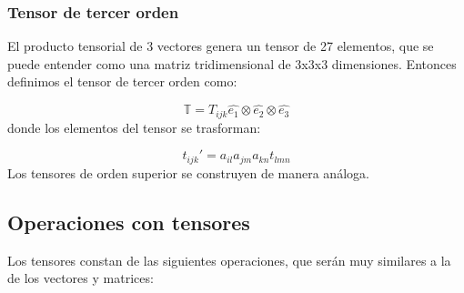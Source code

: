 \documentclass[12pt,a4paper]{book}
\begin{document}
\subsubsection{Tensor de tercer orden}

El producto tensorial de 3 vectores genera un tensor de 27 elementos, que se puede entender como una matriz tridimensional de 3x3x3 dimensiones. Entonces definimos el tensor de tercer orden como:

\begin{equation}
\mathbb{T} = T_{ijk} \widehat{e_1} \otimes \widehat{e_2} \otimes \widehat{e_3}
\end{equation}
donde los elementos del tensor se trasforman:

\begin{equation}
t_{ijk}' = a_{il} a_{jm} a_{kn} t_{lmn}
\end{equation}
Los tensores de orden superior se construyen de manera análoga.


\subsection{Operaciones con tensores}
Los tensores constan de las siguientes operaciones, que serán muy similares a la de los vectores y matrices:
\end{document}
